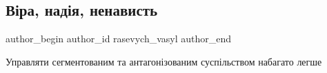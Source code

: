  
 
 
 
 
\subsection{Віра, надія, ненависть}
\label{sec:05_01_2021.news.ua.zaxid.rasevych.1.vira_nadia_nenavyst}
\ifcmt
  author_begin
   author_id rasevych_vasyl
  author_end
\fi

Управляти сегментованим та антагонізованим суспільством набагато легше
